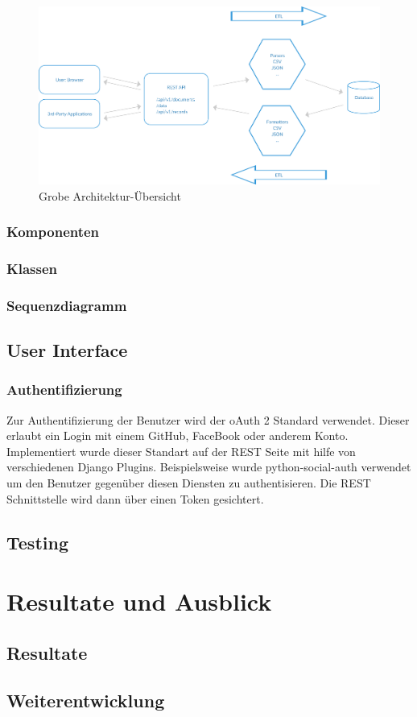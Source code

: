 \begin{figure}[H]
    \centering
    \includegraphics[width=\linewidth]{fig/ODH-Architecture-Overview}
    \caption{Grobe Architektur-Übersicht}
\end{figure}

\subsection{Komponenten}


\subsection{Klassen}


\subsection{Sequenzdiagramm}



\section{User Interface}
\subsection{Authentifizierung}
Zur Authentifizierung der Benutzer wird der oAuth 2 Standard verwendet. Dieser erlaubt ein Login mit einem GitHub, FaceBook oder anderem Konto. Implementiert wurde dieser Standart auf der REST Seite mit hilfe von verschiedenen Django Plugins. 
Beispielsweise wurde python-social-auth verwendet um den Benutzer gegenüber diesen Diensten zu authentisieren. Die REST Schnittstelle wird dann über einen Token gesichtert.


\section{Testing}


\chapter{Resultate und Ausblick}

\section{Resultate}


\section{Weiterentwicklung}


